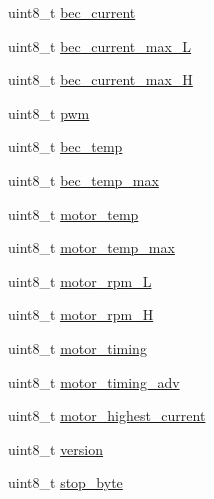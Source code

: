 \begin{DoxyCompactItemize}
uint8\+\_\+t \hyperlink{structHOTT__AIRESC__MSG__s_a93a34c7f0308b6b77766b07d3b7939c3}{bec\+\_\+current}
\item 
uint8\+\_\+t \hyperlink{structHOTT__AIRESC__MSG__s_a7b0e2375b6a3ff815c0e15e1a615cfb8}{bec\+\_\+current\+\_\+max\+\_\+\+L}
\item 
uint8\+\_\+t \hyperlink{structHOTT__AIRESC__MSG__s_a4fce85619a7855107982185ba0d39529}{bec\+\_\+current\+\_\+max\+\_\+\+H}
\item 
uint8\+\_\+t \hyperlink{structHOTT__AIRESC__MSG__s_a0d91fbba234a2be801da0d7de33772c2}{pwm}
\item 
uint8\+\_\+t \hyperlink{structHOTT__AIRESC__MSG__s_a92397f4f6c40967fe03939f214ad3553}{bec\+\_\+temp}
\item 
uint8\+\_\+t \hyperlink{structHOTT__AIRESC__MSG__s_a1ed33c2eea2f67190b549aace6a37d1a}{bec\+\_\+temp\+\_\+max}
\item 
uint8\+\_\+t \hyperlink{structHOTT__AIRESC__MSG__s_a1d7c1c2a755e08fbee25572e69b3d6b1}{motor\+\_\+temp}
\item 
uint8\+\_\+t \hyperlink{structHOTT__AIRESC__MSG__s_a855493faa508777b046566120c3256e6}{motor\+\_\+temp\+\_\+max}
\item 
uint8\+\_\+t \hyperlink{structHOTT__AIRESC__MSG__s_afea18bcee698cb184434e5005c21237d}{motor\+\_\+rpm\+\_\+\+L}
\item 
uint8\+\_\+t \hyperlink{structHOTT__AIRESC__MSG__s_a811332e4b3cc648f9fbb3a35b6286c5c}{motor\+\_\+rpm\+\_\+\+H}
\item 
uint8\+\_\+t \hyperlink{structHOTT__AIRESC__MSG__s_a0e5b030c711092fc467f9f7d947ddb04}{motor\+\_\+timing}
\item 
uint8\+\_\+t \hyperlink{structHOTT__AIRESC__MSG__s_afd5cb0d10fdde41bfccc25ce03347db1}{motor\+\_\+timing\+\_\+adv}
\item 
uint8\+\_\+t \hyperlink{structHOTT__AIRESC__MSG__s_a33b77ca630c39971de818e7bb25a6454}{motor\+\_\+highest\+\_\+current}
\item 
uint8\+\_\+t \hyperlink{structHOTT__AIRESC__MSG__s_a508da3242c7574bdfb9f3049ae8700aa}{version}
\item 
uint8\+\_\+t \hyperlink{structHOTT__AIRESC__MSG__s_aed327797bb7b065b8ab7168fa4900122}{stop\+\_\+byte}
\end{DoxyCompactItemize}


